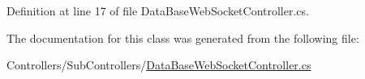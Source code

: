 Definition at line 17 of file Data\+Base\+Web\+Socket\+Controller.\+cs.



The documentation for this class was generated from the following file\+:\begin{DoxyCompactItemize}
\item 
Controllers/\+Sub\+Controllers/\mbox{\hyperlink{_data_base_web_socket_controller_8cs}{Data\+Base\+Web\+Socket\+Controller.\+cs}}\end{DoxyCompactItemize}
